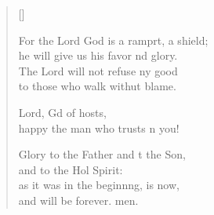 \begin{verse}[\versewidth]
\begin{patverse}
For the Lord God is a ramprt, a shield;\Med\\
he will give us his favor nd glory.\\
The Lord will not refuse ny good\Med\\
to those who walk withut blame.

Lord, Gd of hosts,\Med\\
happy the man who trusts \pointup{\i}n you!

Glory to the Father and t the Son,\Med\\
and to the Hol Spirit:\\
as it was in the beginn\pointup{\i}ng, is now,\Med\\
and will be forever. men. 
  \end{patverse}
\end{verse}
